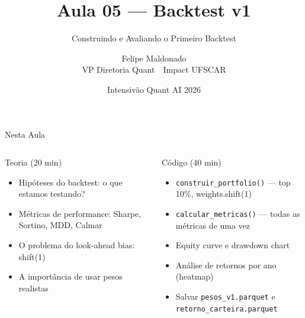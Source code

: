 \documentclass[aspectratio=169,12pt]{beamer}
\author{Felipe Maldonado\\{\scriptsize VP Diretoria Quant~\textbullet{}~Impact UFSCAR}}
\date{Intensivão Quant AI 2026}
\title{Aula 05 --- Backtest v1}
\subtitle{Construindo e Avaliando o Primeiro Backtest}
\begin{document}
\begin{frame}[plain]
\titlepage
\end{frame}

\begin{frame}[fragile]{Nesta Aula}
\begin{columns}[T]
\begin{block}{Teoria (20 min)}
\begin{itemize}
  \item Hipóteses do backtest: o que estamos testando?
  \item Métricas de performance: Sharpe, Sortino, MDD, Calmar
  \item O problema do look-ahead bias: shift(1)
  \item A importância de usar pesos realistas
\end{itemize}
\end{block}
\begin{block}{Código (40 min)}
\begin{itemize}
  \item \texttt{construir\_portfolio()} — top 10\%, weights.shift(1)
  \item \texttt{calcular\_metricas()} — todas as métricas de uma vez
  \item Equity curve e drawdown chart
  \item Análise de retornos por ano (heatmap)
  \item Salvar \texttt{pesos\_v1.parquet} e \texttt{retorno\_carteira.parquet}
\end{itemize}
\end{block}
\end{columns}
\end{frame}
\end{document}
